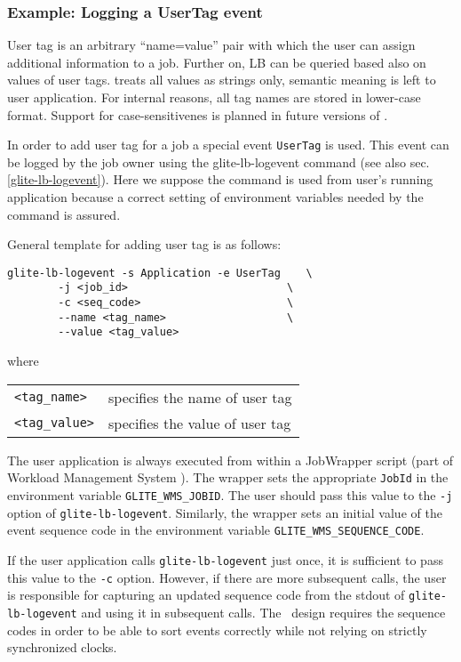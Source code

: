 \subsubsection{Example: Logging a UserTag event}
\label{e:usertag}

User tag is an arbitrary ``name=value'' pair with which the user can assign
additional information to a job. Further on, LB can be queried based also on
values of user tags. \LB treats all values as strings only, semantic meaning
is left to user application. For internal reasons, all tag names are stored 
in lower-case format. Support for case-sensitivenes is planned in future 
versions of \LB.

In order to add user tag for a job a special event \verb'UserTag' is used. This
event can be logged by the job owner using the glite-lb-logevent command (see
also sec.\ref{glite-lb-logevent}). Here we suppose the command is used from
user's running application because a correct setting of environment variables
needed by the command is assured.

General template for adding user tag is as follows:

\begin{verbatim}
glite-lb-logevent -s Application -e UserTag    \
        -j <job_id>                         \
        -c <seq_code>                       \
        --name <tag_name>                   \
        --value <tag_value>
\end{verbatim}

where

\begin{tabularx}{\textwidth}{lX}
\texttt{<tag\_name>}  & specifies the name of user tag \\
\texttt{<tag\_value>} & specifies the value of user tag \\
\end{tabularx}

The user application is always executed from within a JobWrapper script (part
of Workload Management System \cite{jgc}). The wrapper  sets the  appropriate
\verb'JobId' in the environment variable \verb'GLITE_WMS_JOBID'. The user
should pass this value to the \verb'-j' option of \verb'glite-lb-logevent'.
Similarly, the wrapper sets an initial value of the event sequence code in the
environment variable \verb'GLITE_WMS_SEQUENCE_CODE'.

If the user application calls \verb'glite-lb-logevent' just once, it is
sufficient to pass this value to the \verb'-c' option.  However, if there are
more  subsequent calls,  the  user is responsible for capturing an updated
sequence code from the stdout of \verb'glite-lb-logevent' and using it in
subsequent calls. The \LB\ design requires the sequence codes in  order  to be
able to sort events correctly while not relying on strictly synchronized
clocks.

